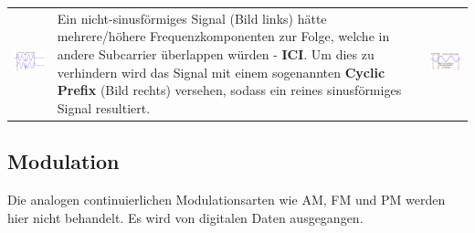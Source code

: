 \begin{tabular}{lll}
	\parbox{6cm}{ 
    \includegraphics[width=6cm]{./bilder/modulation_OFDM-ICI.png}\\
	}    
	& \parbox{6cm}{Ein nicht-sinusförmiges Signal (Bild links) hätte mehrere/höhere
	Frequenzkomponenten zur Folge, welche in andere Subcarrier überlappen würden -
	\textbf{ICI}. Um dies zu verhindern wird das Signal mit einem sogenannten \textbf{Cyclic
	Prefix} (Bild rechts) versehen, sodass ein reines sinusförmiges Signal
	resultiert. \\	
	} &
	\parbox{6cm}{
	\includegraphics[width=6cm]{./bilder/modulation_OFDM-prefix.png}\\ }       
\end{tabular}


\subsection{Modulation}
Die analogen continuierlichen Modulationsarten wie AM, FM und PM werden hier
nicht behandelt. Es wird von digitalen Daten ausgegangen.

